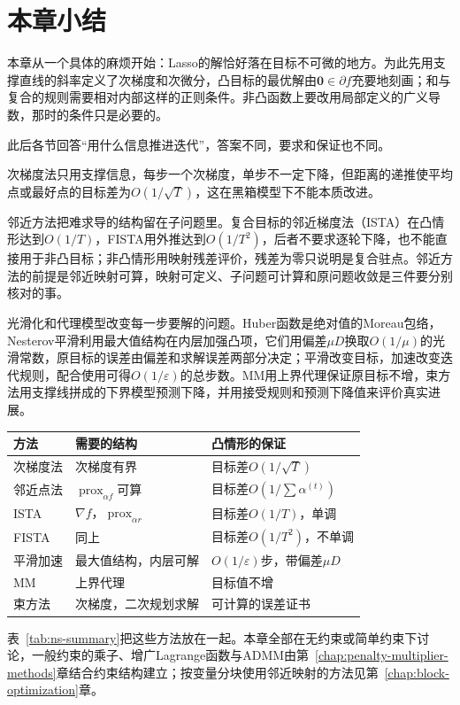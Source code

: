 \section{本章小结}
\label{sec:ns-summary}

本章从一个具体的麻烦开始：Lasso的解恰好落在目标不可微的地方。为此先用支撑直线的斜率定义了次梯度和次微分，凸目标的最优解由$\bm{0}\in\partial f$充要地刻画；和与复合的规则需要相对内部这样的正则条件。非凸函数上要改用局部定义的广义导数，那时的条件只是必要的。

此后各节回答“用什么信息推进迭代”，答案不同，要求和保证也不同。

次梯度法只用支撑信息，每步一个次梯度，单步不一定下降，但距离的递推使平均点或最好点的目标差为$O(1/\sqrt{T})$，这在黑箱模型下不能本质改进。

邻近方法把难求导的结构留在子问题里。复合目标的邻近梯度法（ISTA）在凸情形达到$O(1/T)$，FISTA用外推达到$O(1/T^2)$，后者不要求逐轮下降，也不能直接用于非凸目标；非凸情形用映射残差评价，残差为零只说明是复合驻点。邻近方法的前提是邻近映射可算，映射可定义、子问题可计算和原问题收敛是三件要分别核对的事。

光滑化和代理模型改变每一步要解的问题。Huber函数是绝对值的Moreau包络，Nesterov平滑利用最大值结构在内层加强凸项，它们用偏差$\mu D$换取$O(1/\mu)$的光滑常数，原目标的误差由偏差和求解误差两部分决定；平滑改变目标，加速改变迭代规则，配合使用可得$O(1/\varepsilon)$的总步数。MM用上界代理保证原目标不增，束方法用支撑线拼成的下界模型预测下降，并用接受规则和预测下降值来评价真实进展。

\begin{BookInlineTable}
  \centering
  \small
  \begin{tabular}{@{}lll@{}}
    \toprule
    方法 & 需要的结构 & 凸情形的保证\\
    \midrule
    次梯度法 & 次梯度有界 & 目标差$O(1/\sqrt{T})$\\
    邻近点法 & $\operatorname{prox}_{\alpha f}$可算 & 目标差$O(1/\sum\alpha^{(t)})$\\
    ISTA & $\nabla f$，$\operatorname{prox}_{\alpha r}$ & 目标差$O(1/T)$，单调\\
    FISTA & 同上 & 目标差$O(1/T^2)$，不单调\\
    平滑加速 & 最大值结构，内层可解 & $O(1/\varepsilon)$步，带偏差$\mu D$\\
    MM & 上界代理 & 目标值不增\\
    束方法 & 次梯度，二次规划求解 & 可计算的误差证书\\
    \bottomrule
  \end{tabular}
  \caption{本章方法的对照。$T$为迭代步数，$\varepsilon$为原目标精度。}
  \label{tab:ns-summary}
\end{BookInlineTable}

表~\ref{tab:ns-summary}把这些方法放在一起。本章全部在无约束或简单约束下讨论，一般约束的乘子、增广Lagrange函数与ADMM由第~\ref{chap:penalty-multiplier-methods}章结合约束结构建立；按变量分块使用邻近映射的方法见第~\ref{chap:block-optimization}章。
